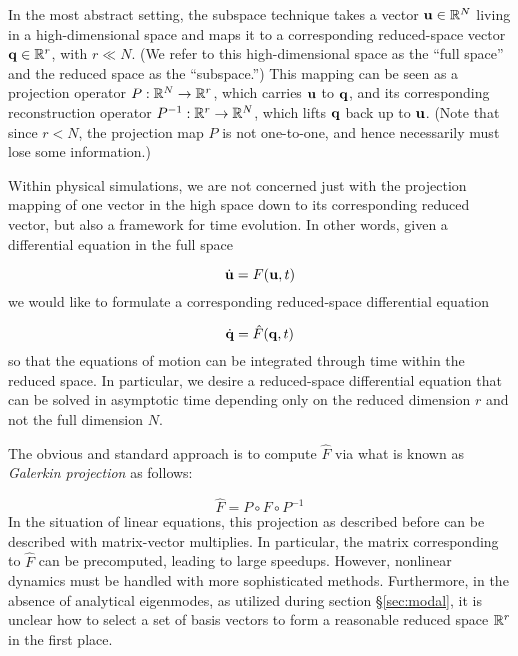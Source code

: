 {In the most abstract setting, the subspace technique takes a vector $\mathbf{u} \in \mathbb{R}^N$ living in a high-dimensional space and maps it to a corresponding reduced-space vector $\mathbf{q} \in \mathbb{R}^r$, with $r \ll N$. (We refer to this high-dimensional space
as the ``full space'' and the reduced space as the ``subspace.'') This mapping can be seen as a projection operator $P : \mathbb{R}^N \rightarrow \mathbb{R}^r$, which carries $\mathbf{u}$ to $\mathbf{q}$, and its corresponding reconstruction operator $P^{-1} : \mathbb{R}^r \rightarrow \mathbb{R}^N$, which lifts $\mathbf{q}$ back up to $\mathbf{u}$. (Note that since $r < N$, the projection map $P$ is not one-to-one, and hence necessarily must lose some information.) 

Within physical simulations, we are not concerned just with the projection mapping of one vector in the high space down to its corresponding reduced vector, but also a framework for time evolution. In other words, given a differential equation in the full space

\begin{equation}
\dot{\mathbf{u}} = F(\mathbf{u}, t)
\end{equation}
we would like to formulate a corresponding reduced-space differential equation

\begin{equation}
\dot{\mathbf{q}} = \hat{F}(\mathbf{q}, t)
\end{equation}
so that the equations of motion can be integrated through time within the reduced space. In particular, we desire a reduced-space differential equation 
that can be solved in asymptotic time depending only on the reduced dimension $r$ and not the full dimension $N$.

The obvious and standard approach is to compute $\hat{F}$ via what is known as {\em Galerkin projection} as follows:

\begin{equation}
\hat{F} = P \circ F \circ P^{-1}
\end{equation}
In the situation of linear equations, this projection as described before can be described with matrix-vector multiplies. In particular, the matrix corresponding
to $\hat{F}$ can be precomputed, leading to large speedups. However, nonlinear dynamics must be handled with more sophisticated methods. Furthermore, in the absence of analytical eigenmodes, as utilized during section \S \ref{sec:modal}, it is unclear how to select a set of basis vectors to form a reasonable reduced space $\mathbb{R}^r$ in the first place. 

}
